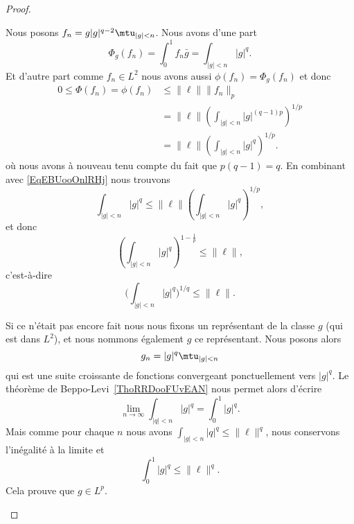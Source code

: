 \begin{proof}
\begin{subproof}
\begin{subproof}
        Nous posons \( f_n=g| g |^{q-2}\mtu_{| g |<n}\). Nous avons d'une part
        \begin{equation}    \label{EqEBUooOnlRHj}
            \Phi_g(f_n)=\int_0^1f_n\bar g=\int_{| g |<n}| g |^q.
        \end{equation}
        Et d'autre part comme \( f_n\in L^2\) nous avons aussi \( \phi(f_n)=\Phi_g(f_n)\) et donc
        \begin{subequations}
            \begin{align}
                0\leq \Phi(f_n)= \phi(f_n) & \leq \| \ell \|\| f_n \|_p                                   \\
                                           & =\| \ell \|\left( \int_{| g |<n}| g |^{(q-1)p} \right)^{1/p} \\
                                           & =\| \ell \|\left( \int_{| g |<n}| g |^q \right)^{1/p}.
            \end{align}
        \end{subequations}
        où nous avons à nouveau tenu compte du fait que \( p(q-1)=q\). En combinant avec \eqref{EqEBUooOnlRHj} nous trouvons
        \begin{equation}
            \int_{| g |<n}| g |^q\leq \| \ell \|\left( \int_{| g |<n}| g |^q \right)^{1/p},
        \end{equation}
        et donc
        \begin{equation}
            \left( \int_{| g |<n}| g |^{q} \right)^{1-\frac{1}{ p }}\leq \| \ell \|,
        \end{equation}
        c'est-à-dire
        \begin{equation}
            \Big( \int_{| g |<n}| g |^q \Big)^{1/q}\leq \| \ell \|.
        \end{equation}

        Si ce n'était pas encore fait nous nous fixons un représentant de la classe \( g\) (qui est dans \( L^2\)), et nous nommons également \( g\) ce représentant. Nous posons alors
        \begin{equation}
            g_n=| g |^q\mtu_{| g |<n}
        \end{equation}
        qui est une suite croissante de fonctions convergeant ponctuellement vers \( | g |^q\). Le théorème de Beppo-Levi~\ref{ThoRRDooFUvEAN} nous permet alors d'écrire
        \begin{equation}
            \lim_{n\to \infty} \int_{| q |<n}| g |^q=\int_{0}^1| g |^q.
        \end{equation}
        Mais comme pour chaque \( n\) nous avons \( \int_{| g |<n}| q |^q\leq \| \ell \|^q\), nous conservons l'inégalité à la limite et
        \begin{equation}
            \int_0^1| g |^q\leq \| \ell \|^q.
        \end{equation}
        Cela prouve que \( g\in L^p\).


\end{subproof}
\end{subproof}
\end{proof}
